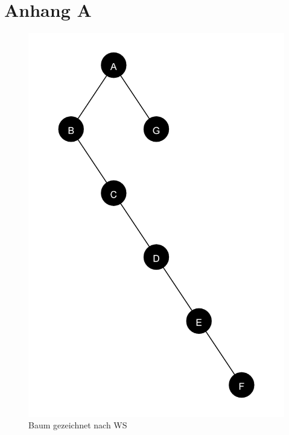 \chapter{Anhang A}
\label{chap:anhang_a}

\begin{figure}[h]
    \centering
    \begin{minipage}[t]{0.45\linewidth}
        \centering
        \includegraphics[scale = 0.075]{abbildungen/tree_spiegel_1_a2}
        \caption[]{Baum gezeichnet nach WS}
    \end{minipage}
    \hfill
    \begin{minipage}[t]{0.45\linewidth}
        \centering

\end{minipage}
\end{figure}
